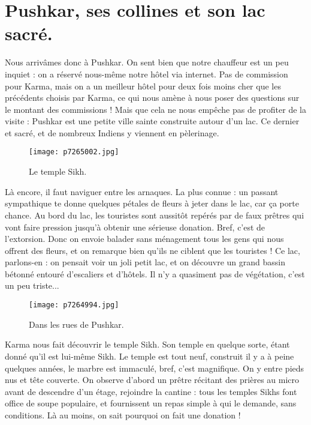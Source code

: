 \documentclass{book}
\begin{document}
\chapter{Pushkar, ses collines et son lac sacré.}
Nous arrivâmes donc à Pushkar. On sent bien que notre chauffeur est un peu inquiet : on a réservé nous-même notre hôtel via internet. Pas de commission pour Karma, mais on a un meilleur hôtel pour deux fois moins cher que les précédents choisis par Karma, ce qui nous amène à nous poser des questions sur le montant des commissions ! Mais que cela ne nous empêche pas de profiter de la visite : Pushkar est une petite ville sainte construite autour d'un lac. Ce dernier et sacré, et de nombreux Indiens y viennent en pèlerinage.


\begin{figure}[h]
\centering
\texttt{[image: p7265002.jpg]}
\caption*{Le temple Sikh.}
\end{figure}

Là encore, il faut naviguer entre les arnaques. La plus connue : un passant sympathique te donne quelques pétales de fleurs à jeter dans le lac, car ça porte chance. Au bord du lac, les touristes sont aussitôt repérés par de faux prêtres qui vont faire pression jusqu'à obtenir une sérieuse donation. Bref, c'est de l'extorsion. Donc on envoie balader sans ménagement tous les gens qui nous offrent des fleurs, et on remarque bien qu'ils ne ciblent que les touristes ! Ce lac, parlons-en : on pensait voir un joli petit lac, et on découvre un grand bassin bétonné entouré d'escaliers et d'hôtels. Il n'y a quasiment pas de végétation, c'est un peu triste...


\begin{figure}[h]
\centering
\texttt{[image: p7264994.jpg]}
\caption*{Dans les rues de Pushkar.}
\end{figure}

Karma nous fait découvrir le temple Sikh. Son temple en quelque sorte, étant donné qu'il est lui-même Sikh. Le temple est tout neuf, construit il y a à peine quelques années, le marbre est immaculé, bref, c'est magnifique. On y entre pieds nus et tête couverte. On observe d'abord un prêtre récitant des prières au micro avant de descendre d'un étage, rejoindre la cantine : tous les temples Sikhs font office de soupe populaire, et fournissent un repas simple à qui le demande, sans conditions. Là au moins, on sait pourquoi on fait une donation !
\end{document}
